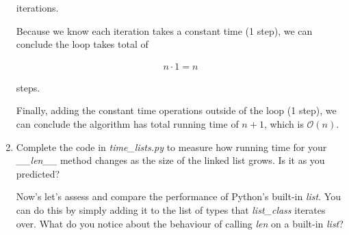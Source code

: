 \documentclass[12pt]{article}
\begin{document}
\begin{enumerate}[1.]
\begin{mdframed}
    iterations.

    \bigskip

    Because we know each iteration takes a constant time (1 step), we can conclude
    the loop takes total of

    \begin{align}
        n \cdot 1 = n
    \end{align}

    \bigskip

    steps.

    \bigskip

    Finally, adding the constant time operations outside of the loop (1 step),
    we can conclude the algorithm has total running time of $n + 1$, which is
    $\mathcal{O}(n)$.

    \end{mdframed}

    \item Complete the code in \textit{time\_lists.py} to measure how running
    time for your \textit{\_\_len\_\_} method changes as the size of the linked
    list grows. Is it as you predicted?

    \bigskip

    Now’s let’s assess and compare the performance of Python’s built-in \textit{list}.
    You can do this by simply adding it to the list of types that \textit{list\_class}
    iterates over. What do you notice about the behaviour of calling \textit{len} on
    a built-in \textit{list}?

\end{enumerate}
\end{document}
